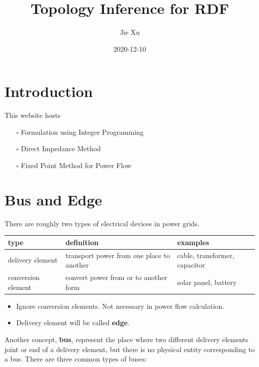 \documentclass[
]{book}
\title{Topology Inference for RDF}
\author{Jie Xu}
\date{2020-12-10}
\providecommand{\tightlist}{%
  \setlength{\itemsep}{0pt}\setlength{\parskip}{0pt}}
\begin{document}
\maketitle

{
\setcounter{tocdepth}{1}
\tableofcontents
}
\hypertarget{introduction}{%
\chapter{Introduction}\label{introduction}}

This website hosts

\begin{itemize}
\tightlist
\item[$\square$]
  Formulation using Integer Programming
\item[$\square$]
  Direct Impedance Method
\item[$\square$]
  Fixed Point Method for Power Flow
\end{itemize}

\hypertarget{bus-edge}{%
\chapter{Bus and Edge}\label{bus-edge}}

There are roughly two types of electrical devices in power grids.

\begin{table}[H]
\centering
\begin{tabular}[t]{l|l|l}
\hline
type & definition & examples\\
\hline
delivery element & transport power from one place to another & cable, transformer, capacitor\\
\hline
conversion element & convert power from or to another form & solar panel, battery\\
\hline
\end{tabular}
\end{table}

\begin{itemize}
\tightlist
\item
  Ignore conversion elements. Not necessary in power flow calculation.
\item
  Delivery element will be called \textbf{edge}.
\end{itemize}

Another concept, \textbf{bus}, represent the place where two different delivery
elements joint or end of a delivery element, but there is no physical entity
corresponding to a bus. There are three common types of buses:
\end{document}
